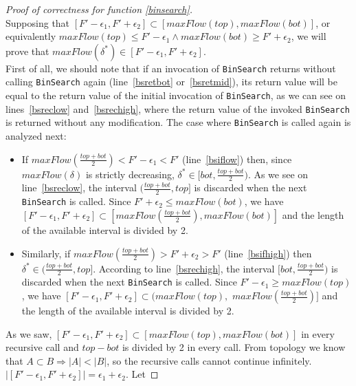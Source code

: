 \documentclass[11pt]{llncs}
\begin{document}
    \begin{proof}[Proof of correctness for function \ref{binsearch}] \ \\
       Supposing that $[F' - \epsilon_1, F' + \epsilon_2] \subset [maxFlow(top),maxFlow(bot)]$, or equivalently
       $maxFlow(top) \leq F' - \epsilon_1 \wedge maxFlow(bot) \geq F' + \epsilon_2$, we will prove that
       $maxFlow(\delta^*) \in [F' - \epsilon_1, F' + \epsilon_2]$. \\
       First of all, we should note that if an invocation of \texttt{BinSearch} returns without calling \texttt{BinSearch}
       again (line~\ref{bsretbot} or~\ref{bsretmid}), its return value will be equal to the return value of the initial
       invocation of \texttt{BinSearch}, as we can see on lines~\ref{bsreclow} and~\ref{bsrechigh}, where the return value of
       the invoked \texttt{BinSearch} is returned without any modification. The case where \texttt{BinSearch} is called again
       is analyzed next:
       \begin{itemize}
          \item If $maxFlow(\frac{top+bot}{2}) < F' - \epsilon_1 < F'$ (line~\ref{bsiflow}) then, since $maxFlow(\delta)$ is
          strictly decreasing, $\delta^* \in [bot,\frac{top+bot}{2})$. As we see on line~\ref{bsreclow}, the interval
          $(\frac{top+bot}{2}, top]$ is discarded when the next \texttt{BinSearch} is called. Since $F' + \epsilon_2 \leq
          maxFlow(bot)$, we have $[F' - \epsilon_1, F' + \epsilon_2] \subset [maxFlow(\frac{top+bot}{2}), maxFlow(bot)]$ and
          the length of the available interval is divided by 2.
          \item Similarly, if $maxFlow(\frac{top+bot}{2}) > F' + \epsilon_2 > F'$ (line~\ref{bsifhigh}) then $\delta^* \in
          (\frac{top+bot}{2}, top]$. According to line~\ref{bsrechigh}, the interval $[bot, \frac{top+bot}{2})$ is discarded
          when the next \texttt{BinSearch} is called. Since $F'- \epsilon_1 \geq maxFlow(top)$, we have $[F' - \epsilon_1, F'
          + \epsilon_2] \subset (maxFlow(top),$ $maxFlow(\frac{top+bot}{2})]$ and the length of the available interval is
          divided by 2.
       \end{itemize}
       As we saw, $[F' - \epsilon_1, F' + \epsilon_2] \subset [maxFlow(top),maxFlow(bot)]$ in every recursive call and
       $top - bot$ is divided by 2 in every call. From topology we know that $A \subset B \Rightarrow |A| < |B|$, so the
       recursive calls cannot continue infinitely. $|[F' - \epsilon_1, F' + \epsilon_2]| = \epsilon_1 + \epsilon_2$. Let

\end{proof}
\end{document}
